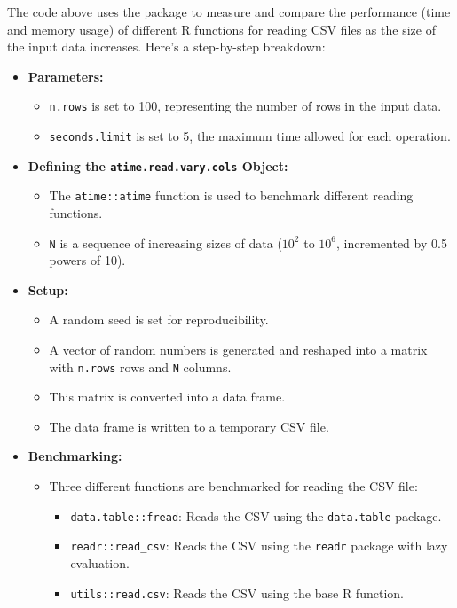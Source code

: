 The code above uses the  package to measure and compare the performance (time and memory usage) of different R functions for reading CSV files as the size of the input data increases. Here's a step-by-step breakdown:

\begin{itemize}
    \item \textbf{Parameters:}
    \begin{itemize}
        \item \texttt{n.rows} is set to 100, representing the number of rows in the input data.
        \item \texttt{seconds.limit} is set to 5, the maximum time allowed for each operation.
    \end{itemize}

    \item \textbf{Defining the \texttt{atime.read.vary.cols} Object:}
    \begin{itemize}
        \item The \texttt{atime::atime} function is used to benchmark different reading functions.
        \item \texttt{N} is a sequence of increasing sizes of data (\(10^2\) to \(10^6\), incremented by 0.5 powers of 10).
    \end{itemize}

    \item \textbf{Setup:}
    \begin{itemize}
        \item A random seed is set for reproducibility.
        \item A vector of random numbers is generated and reshaped into a matrix with \texttt{n.rows} rows and \texttt{N} columns.
        \item This matrix is converted into a data frame.
        \item The data frame is written to a temporary CSV file.
    \end{itemize}

    \item \textbf{Benchmarking:}
    \begin{itemize}
        \item Three different functions are benchmarked for reading the CSV file:
        \begin{itemize}
            \item \texttt{data.table::fread}: Reads the CSV using the \texttt{data.table} package.
            \item \texttt{readr::read\_csv}: Reads the CSV using the \texttt{readr} package with lazy evaluation.
            \item \texttt{utils::read.csv}: Reads the CSV using the base R function.
        \end{itemize}
    \end{itemize}
\end{itemize}

